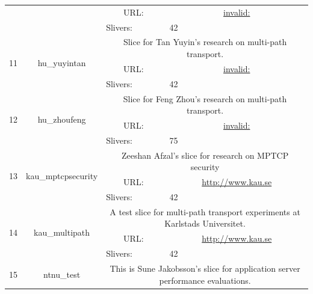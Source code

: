 \begin{small}
\begin{center}
\begin{longtable}{|c|c|c|c|}
  &  & \multicolumn{1}{|p{5em}|}{URL:} & \multicolumn{1}{|p{22.5em}|}{\url{invalid:}} \\* \cline{3-3}\cline{4-4}
  &  & \multicolumn{1}{|l|}{Slivers:} & \multicolumn{1}{|l|}{42} \\ \hline
 \multirow{3}{*}{11} & \multirow{3}{*}{\index{hu\_yuyintan}\index{Slice!hu\_yuyintan}hu\_yuyintan} & \multicolumn{2}{|p{30em}|}{Slice for Tan Yuyin's research on multi-path transport.} \\* \cline{3-3}\cline{4-4}
  &  & \multicolumn{1}{|p{5em}|}{URL:} & \multicolumn{1}{|p{22.5em}|}{\url{invalid:}} \\* \cline{3-3}\cline{4-4}
  &  & \multicolumn{1}{|l|}{Slivers:} & \multicolumn{1}{|l|}{42} \\ \hline
 \multirow{3}{*}{12} & \multirow{3}{*}{\index{hu\_zhoufeng}\index{Slice!hu\_zhoufeng}hu\_zhoufeng} & \multicolumn{2}{|p{30em}|}{Slice for Feng Zhou's research on multi-path transport.} \\* \cline{3-3}\cline{4-4}
  &  & \multicolumn{1}{|p{5em}|}{URL:} & \multicolumn{1}{|p{22.5em}|}{\url{invalid:}} \\* \cline{3-3}\cline{4-4}
  &  & \multicolumn{1}{|l|}{Slivers:} & \multicolumn{1}{|l|}{75} \\ \hline
 \multirow{3}{*}{13} & \multirow{3}{*}{\index{kau\_mptcpsecurity}\index{Slice!kau\_mptcpsecurity}kau\_mptcpsecurity} & \multicolumn{2}{|p{30em}|}{Zeeshan Afzal's slice for research on MPTCP security} \\* \cline{3-3}\cline{4-4}
  &  & \multicolumn{1}{|p{5em}|}{URL:} & \multicolumn{1}{|p{22.5em}|}{\url{http://www.kau.se}} \\* \cline{3-3}\cline{4-4}
  &  & \multicolumn{1}{|l|}{Slivers:} & \multicolumn{1}{|l|}{42} \\ \hline
 \multirow{3}{*}{14} & \multirow{3}{*}{\index{kau\_multipath}\index{Slice!kau\_multipath}kau\_multipath} & \multicolumn{2}{|p{30em}|}{A test slice for multi-path transport experiments at Karlstads Universitet.} \\* \cline{3-3}\cline{4-4}
  &  & \multicolumn{1}{|p{5em}|}{URL:} & \multicolumn{1}{|p{22.5em}|}{\url{http://www.kau.se}} \\* \cline{3-3}\cline{4-4}
  &  & \multicolumn{1}{|l|}{Slivers:} & \multicolumn{1}{|l|}{42} \\ \hline
 \multirow{3}{*}{15} & \multirow{3}{*}{\index{ntnu\_test}\index{Slice!ntnu\_test}ntnu\_test} & \multicolumn{2}{|p{30em}|}{This is Sune Jakobsson's slice for application server performance evaluations.} \\* \cline{3-3}\cline{4-4}

\end{longtable}
\end{center}
\end{small}

